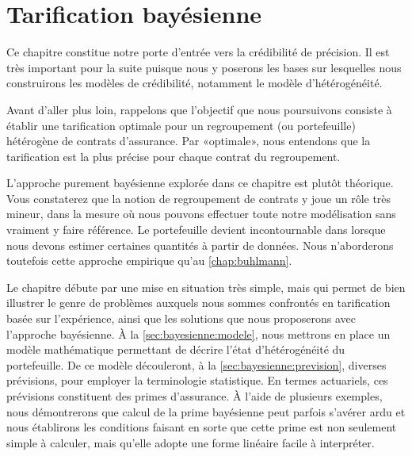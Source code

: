 
\chapter{Tarification bayésienne}
\label{chap:bayesienne}

Ce chapitre constitue notre porte d'entrée vers la crédibilité de
précision. Il est très important pour la suite puisque nous y poserons
les bases sur lesquelles nous construirons les modèles de crédibilité,
notamment le modèle d'hétérogénéité.

Avant d'aller plus loin, rappelons que l'objectif que nous poursuivons
consiste à établir une tarification optimale pour un regroupement (ou
portefeuille) hétérogène de contrats d'assurance. Par «optimale», nous
entendons que la tarification est la plus précise pour chaque contrat
du regroupement.

L'approche purement bayésienne explorée dans ce chapitre est plutôt
théorique. Vous constaterez que la notion de regroupement de contrats
y joue un rôle très mineur, dans la mesure où nous pouvons effectuer
toute notre modélisation sans vraiment y faire référence. Le
portefeuille devient incontournable dans lorsque nous devons estimer
certaines quantités à partir de données. Nous n'aborderons toutefois
cette approche empirique qu'au \autoref{chap:buhlmann}.

Le chapitre débute par une mise en situation très simple, mais qui
permet de bien illustrer le genre de problèmes auxquels nous sommes
confrontés en tarification basée sur l'expérience, ainsi que les
solutions que nous proposerons avec l'approche bayésienne. À la
\autoref{sec:bayesienne:modele}, nous mettrons en place un modèle
mathématique permettant de décrire l'état d'hétérogénéité du
portefeuille. De ce modèle découleront, à la
\autoref{sec:bayesienne:prevision}, diverses prévisions, pour employer
la terminologie statistique. En termes actuariels, ces prévisions
constituent des primes d'assurance. À l'aide de plusieurs exemples,
nous démontrerons que calcul de la prime bayésienne peut parfois
s'avérer ardu et nous établirons les conditions faisant en sorte que
cette prime est non seulement simple à calculer, mais qu'elle adopte
une forme linéaire facile à interpréter.

